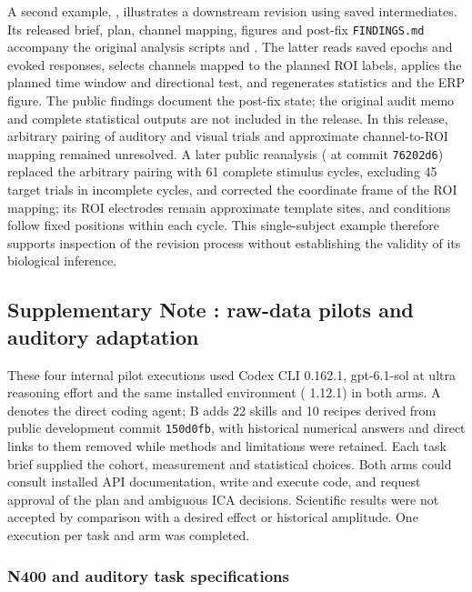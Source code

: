 A second example, , illustrates a downstream revision using saved intermediates. Its released brief, plan, channel mapping, figures and post-fix \texttt{FINDINGS.md} accompany the original analysis scripts and . The latter reads saved epochs and evoked responses, selects channels mapped to the planned ROI labels, applies the planned time window and directional test, and regenerates statistics and the ERP figure. The public findings document the post-fix state; the original audit memo and complete statistical outputs are not included in the release. In this release, arbitrary pairing of auditory and visual trials and approximate channel-to-ROI mapping remained unresolved. A later public reanalysis ( at commit \texttt{76202d6}) replaced the arbitrary pairing with 61 complete stimulus cycles, excluding 45 target trials in incomplete cycles, and corrected the coordinate frame of the ROI mapping; its ROI electrodes remain approximate template sites, and conditions follow fixed positions within each cycle. This single-subject example therefore supports inspection of the revision process without establishing the validity of its biological inference.


\FloatBarrier
{}
\subsection*{Supplementary Note \thesuppnote: raw-data pilots and auditory adaptation}
\label{si:pilots}

These four internal pilot executions used Codex CLI 0.162.1, gpt-6.1-sol at ultra reasoning effort and the same installed environment (\mne{} 1.12.1) in both arms. A denotes the direct coding agent; B adds 22 skills and 10 recipes derived from public development commit \texttt{150d0fb}, with historical numerical answers and direct links to them removed while methods and limitations were retained. Each task brief supplied the cohort, measurement and statistical choices. Both arms could consult installed API documentation, write and execute code, and request approval of the plan and ambiguous ICA decisions. Scientific results were not accepted by comparison with a desired effect or historical amplitude. One execution per task and arm was completed.

\subsubsection*{N400 and auditory task specifications}

